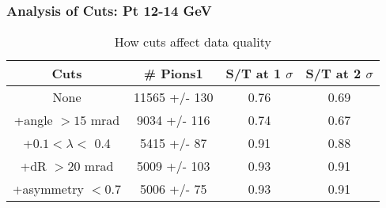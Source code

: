 \frame
{
\frametitle{Analysis of Cuts: Pt 12-14 GeV}
\begin{table}
\caption{How cuts affect data quality}
\centering
\begin{tabular}{c c c c}
\hline\hline
Cuts & \# Pions1 & S/T at 1 $\sigma$ & S/T at 2 $\sigma$ \\ [0.5ex]
\hline
None & 11565 +/-  130 & 0.76 & 0.69 \\ %
+angle $> 15$ mrad & 9034 +/-  116 & 0.74 & 0.67 \\ %
+$0.1 < \lambda <$ 0.4 & 5415 +/-   87 & 0.91 & 0.88 \\ %
+dR $> 20$ mrad & 5009 +/-  103 & 0.93 & 0.91 \\ %
+asymmetry $< 0.7$ & 5006 +/-   75 & 0.93 & 0.91 \\ %
[1ex]
\hline
\end{tabular}
\label{table:nonlin}
\end{table}
}
